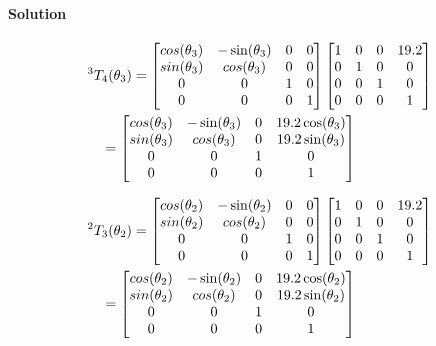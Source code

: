 \documentclass{article}
\begin{document}
\paragraph*{Solution}
\begin{align}
  &{}^3T_4(\theta_3) =
                      \begin{bmatrix}
                        cos(\theta_3) & -\sin(\theta_3) & 0 & 0 \\
                        sin(\theta_3) & cos(\theta_3) & 0 & 0 \\
                        0 & 0 & 1 & 0 \\
                        0 & 0 & 0 & 1
                      \end{bmatrix}
                      \begin{bmatrix}
    1 & 0 & 0 & 19.2 \\
    0 & 1 & 0 & 0 \\
    0 & 0 & 1 & 0 \\
    0 & 0 & 0 & 1
  \end{bmatrix}
                \notag\\
  &\quad= \begin{bmatrix}
    cos(\theta_3) & -\sin(\theta_3) & 0 & 19.2\cos(\theta_3) \\
    sin(\theta_3) & cos(\theta_3) & 0 & 19.2\sin(\theta_3) \\
    0 & 0 & 1 & 0 \\
    0 & 0 & 0 & 1
  \end{bmatrix}
\end{align}

\begin{align}
  &{}^2T_3(\theta_2) =
    \begin{bmatrix}
      cos(\theta_2) & -\sin(\theta_2) & 0 & 0 \\
      sin(\theta_2) & cos(\theta_2) & 0 & 0 \\
      0 & 0 & 1 & 0 \\
      0 & 0 & 0 & 1
    \end{bmatrix}
                  \begin{bmatrix}
                    1 & 0 & 0 & 19.2 \\
                    0 & 1 & 0 & 0 \\
                    0 & 0 & 1 & 0 \\
                    0 & 0 & 0 & 1
                  \end{bmatrix}
                                \notag\\
  &\quad= \begin{bmatrix}
    cos(\theta_2) & -\sin(\theta_2) & 0 & 19.2\cos(\theta_2) \\
    sin(\theta_2) & cos(\theta_2) & 0 & 19.2\sin(\theta_2) \\
    0 & 0 & 1 & 0 \\
    0 & 0 & 0 & 1
  \end{bmatrix}
\end{align}
\end{document}
